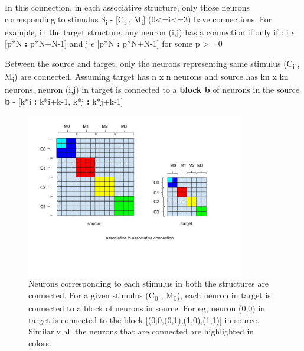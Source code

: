 \documentclass[11pt]{article}
\begin{document}
In this connection, in each associative structure, only those neurons corresponding to stimulus S\textsubscript{i} - [C\textsubscript{i} , M\textsubscript{i}] (0<=i<=3) have connections. For example, in the target structure, any neuron (i,j) has a connection if only if :
i $\epsilon$ [p*N \textbf{:} p*N+N-1] and j $\epsilon$ [p*N \textbf{:} p*N+N-1] for some p >= 0

Between the source and target, only the neurons representing same stimulus (C\textsubscript{i} , M\textsubscript{i}) are connected. Assuming target has n x n neurons and source has kn x kn neurons, neuron (i,j) in target is connected to a \textbf{block b} of neurons in the source \\

\textbf{b} - [k*i \textbf{:} k*i+k-1, k*j \textbf{:} k*j+k-1] 

\begin{figure}[h]
\begin{center}
\includegraphics[width=0.85\textwidth]{AssociativeToAssociative.jpg}
\caption[Associative (cortex) to Associative (striatum)]{Neurons corresponding to each stimulus in both the structures are connected. For a given stimulus (C\textsubscript{0} , M\textsubscript{0}), each neuron in target is connected to a block of neurons in source. For eg, neuron (0,0) in target is connected to the block [(0,0,(0,1),(1,0),(1,1)] in source. Similarly all the neurons that are connected are highlighted in colors.}
\end{center}
\end{figure}
	
\end{document}
